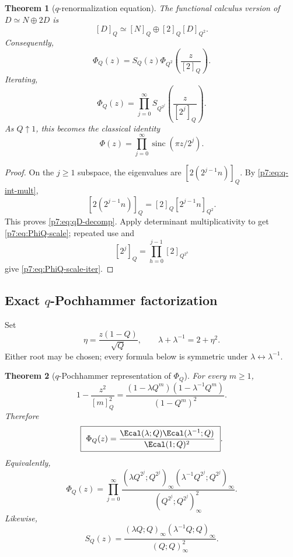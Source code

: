 \documentclass[11pt]{article}
\numberwithin{equation}{section}
\newtheorem{theorem}{Theorem}[section]
\theoremstyle{definition}
\theoremstyle{remark}
\newcommand{\sinc}{\operatorname{sinc}}
\begin{document}
\begin{theorem}[$q$-renormalization equation]\label{p7:thm:q-scaling}
The functional calculus version of $D\simeq N\oplus2D$ is
\begin{equation}\label{p7:eq:qD-decomp}
 [D]_Q\simeq[N]_Q\oplus[2]_Q[D]_{Q^2}.
\end{equation}
Consequently,
\begin{equation}\label{p7:eq:PhiQ-scale}
 \boxed{\ \Phi_Q(z)=S_Q(z)
 \Phi_{Q^2}\!\left(\frac{z}{[2]_Q}\right).\ }
\end{equation}
Iterating,
\begin{equation}\label{p7:eq:PhiQ-scale-iter}
 \boxed{\ \Phi_Q(z)=\prod_{j=0}^{\infty}
 S_{Q^{2^j}}\!\left(\frac{z}{[2^j]_Q}\right).\ }
\end{equation}
As $Q\uparrow1$, this becomes the classical identity
\[
 \Phi(z)=\prod_{j=0}^{\infty}\sinc(\pi z/2^j).
\]
\end{theorem}

\begin{proof}
On the $j\ge1$ subspace, the eigenvalues are $[2(2^{j-1}n)]_Q$.  By \cref{p7:eq:q-int-mult},
\[
 [2(2^{j-1}n)]_Q=[2]_Q[2^{j-1}n]_{Q^2}.
\]
This proves \cref{p7:eq:qD-decomp}.  Apply determinant multiplicativity to get \cref{p7:eq:PhiQ-scale}; repeated use and
\[
 [2^j]_Q=\prod_{h=0}^{j-1}[2]_{Q^{2^h}}
\]
give \cref{p7:eq:PhiQ-scale-iter}.
\end{proof}

\subsection{Exact $q$-Pochhammer factorization}

Set
\begin{equation}\label{p7:eq:eta-lambda}
 \eta=\frac{z(1-Q)}{\sqrt Q},
 \qquad
 \lambda+\lambda^{-1}=2+\eta^2.
\end{equation}
Either root may be chosen; every formula below is symmetric under $\lambda\leftrightarrow\lambda^{-1}$.

\begin{theorem}[$q$-Pochhammer representation of $\Phi_Q$]\label{p7:thm:PhiQ-pch}
For every $m\ge1$,
\begin{equation}\label{p7:eq:single-qfactor}
 1-\frac{z^2}{[m]_Q^2}
 =\frac{(1-\lambda Q^m)(1-\lambda^{-1}Q^m)}{(1-Q^m)^2}.
\end{equation}
Therefore
\begin{equation}\label{p7:eq:PhiQ-E}
 \boxed{\ \Phi_Q(z)
 =\frac{\Ecal(\lambda;Q)\Ecal(\lambda^{-1};Q)}{\Ecal(1;Q)^2}\ }.
\end{equation}
Equivalently,
\begin{equation}\label{p7:eq:PhiQ-tower}
 \Phi_Q(z)=\prod_{j=0}^{\infty}
 \frac{(\lambda Q^{2^j};Q^{2^j})_\infty
       (\lambda^{-1}Q^{2^j};Q^{2^j})_\infty}
      {(Q^{2^j};Q^{2^j})_\infty^2}.
\end{equation}
Likewise,
\begin{equation}\label{p7:eq:SQ-pch}
 S_Q(z)=
 \frac{(\lambda Q;Q)_\infty(\lambda^{-1}Q;Q)_\infty}
      {(Q;Q)_\infty^2}.
\end{equation}
\end{theorem}
\end{document}
